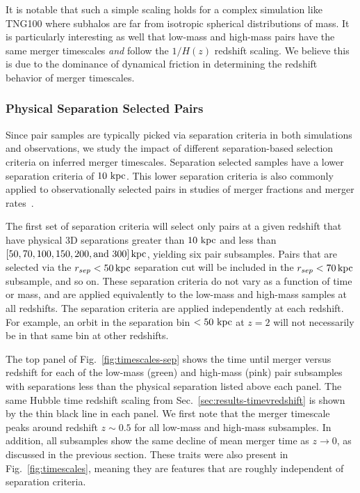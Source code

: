 \documentclass[twocolumn,linenumbers]{aastex631}
\begin{document}
        It is notable that such a simple scaling holds for a complex simulation like TNG100 where subhalos are far from isotropic spherical distributions of mass.
        It is particularly interesting as well that low-mass and high-mass pairs have the same merger timescales \textit{and} follow the $1/H(z)$ redshift scaling. 
        We believe this is due to the dominance of dynamical friction in determining the redshift behavior of merger timescales. 
        
            


            

    \subsubsection{Physical Separation Selected Pairs }
    \label{sec:results-phys}
        Since pair samples are typically picked via separation criteria in both simulations and observations, we study the impact of different separation-based selection criteria on inferred merger timescales.
        Separation selected samples have a lower separation criteria of $10\,\mathrm{\,kpc}$.
        This lower separation criteria is also commonly applied to observationally selected pairs in studies of merger fractions and merger rates~\citep[see e.g.][and observational studies cited therein]{Lotz2011,Snyder2017,Besla2018,Chamberlain2024}.
        
        The first set of separation criteria will select only pairs at a given redshift that have physical 3D separations greater than $10\,\mathrm{\,kpc}$ and less than $[50, 70, 100, 150, 200, \mbox{and }300]\mathrm{\,kpc}$, yielding six pair subsamples. 
        Pairs that are selected via the $r_{sep}<50\mathrm{\,kpc}$ separation cut will be included in the $r_{sep}<70\mathrm{\,kpc}$ subsample, and so on.
        These separation criteria do not vary as a function of time or mass, and are applied equivalently to the low-mass and high-mass samples at all redshifts. 
        The separation criteria are applied independently at each redshift.
        For example, an orbit in the separation bin $<50\,\mathrm{\,kpc}$ at $z=2$ will not necessarily be in that same bin at other redshifts. 
        
        The top panel of Fig.~\ref{fig:timescales-sep} shows the time until merger versus redshift for each of the low-mass (green) and high-mass (pink) pair subsamples with separations less than the physical separation listed above each panel. 
        The same Hubble time redshift scaling from Sec.~\ref{sec:results-timevredshift} is shown by the thin black line in each panel.
        We first note that the merger timescale peaks around redshift $z\sim0.5$ for all low-mass and high-mass subsamples. 
        In addition, all subsamples show the same decline of mean merger time as $z\to0$, as discussed in the previous section. 
        These traits were also present in Fig.~\ref{fig:timescales}, meaning they are features that are roughly independent of separation criteria.
        
\end{document}

